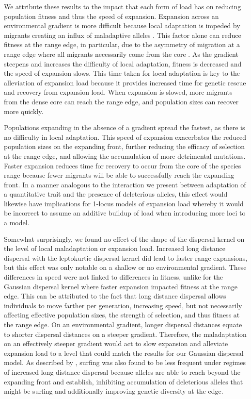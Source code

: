 We attribute these results to the impact that each form of load has on reducing population fitness and thus the speed of expansion. Expansion across an environmental gradient is more difficult because local adaptation is impeded by migrants creating an influx of maladaptive alleles \citep{Kirkpatrick:1997, Barton:2001, Polechova:2015}. This factor alone can reduce fitness at the range edge, in particular, due to the asymmetry of migration at a range edge where all migrants necessarily come from the core \citep{Kirkpatrick:1997}. As the gradient steepens and increases the difficulty of local adaptation, fitness is decreased and the speed of expansion slows. This time taken for local adaptation is key to the alleviation of expansion load because it provides increased time for genetic rescue and recovery from expansion load. When expansion is slowed, more migrants from the dense core can reach the range edge, and population sizes can recover more quickly.

Populations expanding in the absence of a gradient spread the fastest, as there is no difficulty in local adaptation. This speed of expansion exacerbates the reduced population sizes on the expanding front, further reducing the efficacy of selection at the range edge, and allowing the accumulation of more detrimental mutations. Faster expansion reduces time for recovery to occur from the core of the species range because fewer migrants will be able to successfully reach the expanding front. In a manner analogous to the interaction we present between adaptation of a quantitative trait and the presence of deleterious alleles, this effect would likewise have implications for 1-locus models of expansion load whereby it would be incorrect to assume an additive buildup of load when introducing more loci to a model.


Somewhat surprisingly, we found no effect of the shape of the dispersal kernel on the level of local maladaptation or expansion load. Increased long distance dispersal with the leptokurtic dispersal kernel did lead to faster range expansions, but this effect was only notable on a shallow or no environmental gradient. These differences in speed were not linked to differences in fitness, unlike for the Gaussian dispersal kernel where faster expansion impacted fitness at the range edge. This can be attributed to the fact that long distance dispersal allows individuals to move farther per generation, increasing speed, but not necessarily affecting effective population sizes, the strength of selection, and thus fitness at the range edge. On an environmental gradient, longer dispersal distances equate to shorter dispersal distances on a steeper gradient. Therefore, the maladaptation on an effectively steeper gradient would act to slow expansion and alleviate expansion load to a level that could match the results for our Gaussian dispersal model. As described by \citet{Fayard:2009}, surfing was also found to be less frequent under regimes of increased long distance dispersal because alleles are able to reach beyond the expanding front and establish, inhibiting accumulation of deleterious alleles that might be surfing and additionally improving genetic diversity at the edge. 



